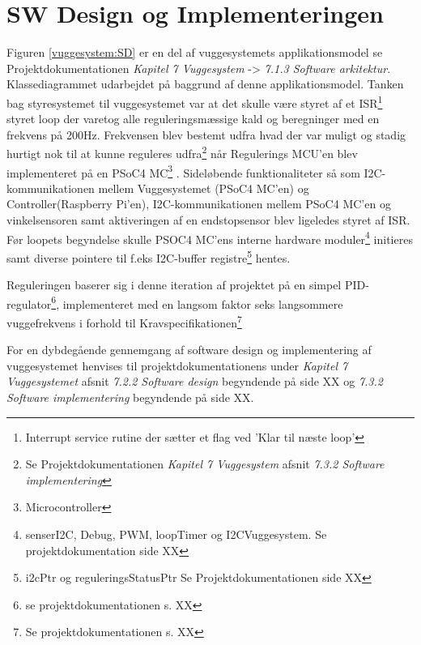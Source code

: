 \section{SW Design og Implementeringen}
\label{vs_sw}
Figuren \ref{vuggesystem:SD} er en del af vuggesystemets applikationsmodel se Projektdokumentationen \textit{Kapitel 7 Vuggesystem} -> \textit{7.1.3 Software arkitektur}. Klassediagrammet udarbejdet på baggrund af denne applikationsmodel.
Tanken bag styresystemet til vuggesystemet var at det skulle være styret af et ISR\footnote{Interrupt service rutine der sætter et flag ved 'Klar til næste loop'} styret loop der varetog alle reguleringsmæssige kald og beregninger med en frekvens på 200Hz. Frekvensen blev bestemt udfra hvad der var muligt og stadig hurtigt nok til at kunne reguleres udfra\footnote{Se Projektdokumentationen \textit{Kapitel 7 Vuggesystem} afsnit \textit{7.3.2 Software implementering}} når Regulerings MCU'en blev implementeret på en PSoC4 MC\footnote{Microcontroller} \citep{website:Cypress}. Sideløbende funktionaliteter så som I2C-kommunikationen mellem Vuggesystemet (PSoC4 MC'en) og Controller(Raspberry Pi'en), I2C-kommunikationen mellem PSoC4 MC'en og vinkelsensoren samt aktiveringen af en endstopsensor blev ligeledes styret af ISR. Før loopets begyndelse skulle PSOC4 MC'ens interne hardware moduler\footnote{senserI2C, Debug, PWM, loopTimer og I2CVuggesystem. Se projektdokumentation side XX} initieres samt diverse pointere til f.eks I2C-buffer registre\footnote{i2cPtr og reguleringsStatusPtr Se Projektdokumentationen side XX} hentes.

Reguleringen baserer sig i denne iteration af projektet på en simpel PID-regulator\footnote{ se projektdokumentationen s. XX}, implementeret med en langsom faktor seks langsommere vuggefrekvens i forhold til Kravspecifikationen\footnote{Se projektdokumentationen s. XX} 

For en dybdegående gennemgang af software design og implementering af vuggesystemet henvises til projektdokumentationens under \textit{Kapitel 7 Vuggesystemet} afsnit \textit{7.2.2 Software design} begyndende på side XX og \textit{7.3.2 Software implementering} begyndende på side XX.

